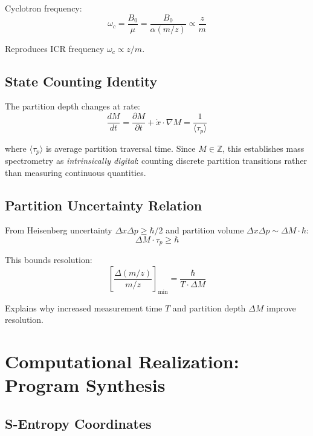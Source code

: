 \documentclass[twocolumn,aps,prl,superscriptaddress,floatfix]{revtex4-2}
\begin{document}
Cyclotron frequency:
\begin{equation}
\omega_c = \frac{B_0}{\mu} = \frac{B_0}{\alpha(m/z)} \propto \frac{z}{m}
\end{equation}

Reproduces ICR frequency $\omega_c \propto z/m$.

\subsection{State Counting Identity}

The partition depth changes at rate:
\begin{equation}
\frac{dM}{dt} = \frac{\partial M}{\partial t} + \dot{x} \cdot \nabla M = \frac{1}{\langle \tau_p \rangle}
\label{eq:state_counting}
\end{equation}

where $\langle \tau_p \rangle$ is average partition traversal time. Since $M \in \mathbb{Z}$, this establishes mass spectrometry as \emph{intrinsically digital}: counting discrete partition transitions rather than measuring continuous quantities.

\subsection{Partition Uncertainty Relation}

From Heisenberg uncertainty $\Delta x \Delta p \geq \hbar/2$ and partition volume $\Delta x \Delta p \sim \Delta M \cdot \hbar$:
\begin{equation}
\Delta M \cdot \tau_p \geq \hbar
\label{eq:partition_uncertainty}
\end{equation}

This bounds resolution:
\begin{equation}
\left[\frac{\Delta(m/z)}{m/z}\right]_{\min} = \frac{\hbar}{T \cdot \Delta M}
\end{equation}

Explains why increased measurement time $T$ and partition depth $\Delta M$ improve resolution.

\section{Computational Realization: Program Synthesis}

\subsection{S-Entropy Coordinates}
\end{document}
